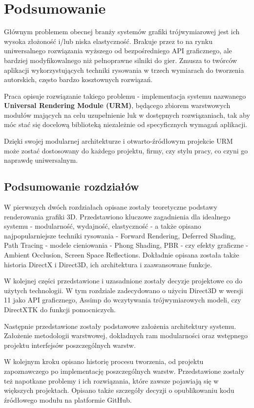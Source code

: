 \chapter{Podsumowanie}
Głównym problemem obecnej branży systemów grafiki trójwymiarowej jest ich wysoka złożoność i/lub niska elastyczność. Brakuje przez to na rynku uniwersalnego rozwiązania wyższego od bezpośredniego API graficznego, ale bardziej modyfikowalnego niż pełnoprawne silniki do gier. Zmusza to twórców aplikacji wykorzystujących techniki rysowania w trzech wymiarach do tworzenia autorskich, często bardzo kosztownych rozwiązań.

Praca opisuje rozwiązanie takiego problemu - implementacja systemu nazwanego \textbf{Universal Rendering Module (URM)}, będącego zbiorem warstwowych modułów mających na celu uzupełnienie luk w dostępnych rozwiązaniach, tak aby móc stać się docelową biblioteką niezależnie od specyficznych wymagań aplikacji.

Dzięki swojej modularnej architekturze i otwarto-źródłowym projekcie URM może zostać dostosowany do każdego projektu, firmy, czy stylu pracy, co czyni go naprawdę uniwersalnym.

\section{Podsumowanie rozdziałów}
W pierwszych dwóch rozdziałach opisane zostały teoretyczne podstawy renderowania grafiki 3D. Przedstawiono kluczowe zagadnienia dla idealnego systemu - modularność, wydajność, elastyczność - a także opisano najpopularniejsze techniki rysowania - Forward Rendering, Deferred Shading, Path Tracing - modele cieniowania - Phong Shading, PBR - czy efekty graficzne - Ambient Occlusion, Screen Space Reflections. Dokładnie opisana została także historia DirectX i Direct3D, ich architektura i zaawansowane funkcje. 

W kolejnej części przedstawione i uzasadnione zostały decyzje projektowe co do użytych technologii. W tym rozdziale zadecydowano o użyciu Direct3D w wersji 11 jako API graficznego, Assimp do wczytywania trójwymiarowych modeli, czy DirectXTK do funkcji pomocniczych. 

Następnie przedstawione zostały podstawowe założenia architektury systemu. Założenie metodologii warstwowej, dokładnych ram modularności oraz wstępnego projektu interfejsów poszczególnych warstw.

W kolejnym kroku opisano historię procesu tworzenia, od projektu zapoznawczego po implementację poszczególnych warstw. Przedstawione zostały też napotkane problemy i ich rozwiązania, które zawsze pojawiają się w większych projektach. Opisano także szczegóły decyzji o opublikowaniu kodu źródłowego modułu na platformie GitHub. 

